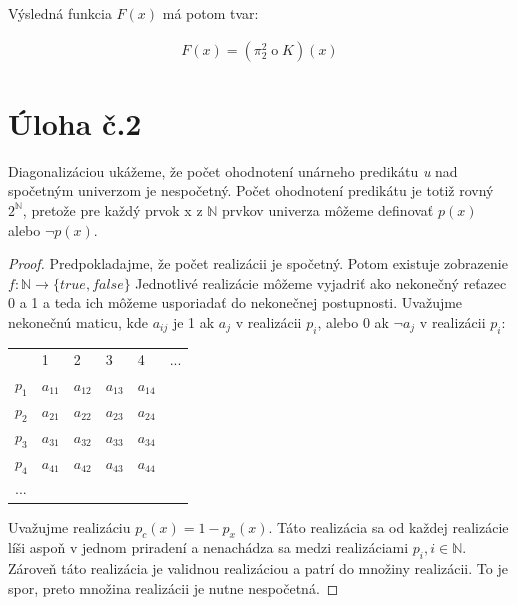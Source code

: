 \documentclass[10pt]{article}
\begin{document}
Výsledná funkcia $F(x)$ má potom tvar:

\begin{align*}
    F(x) = (\pi_2^2 \mathbin{o} K) (x)
\end{align*}

\section*{Úloha č.2}
Diagonalizáciou ukážeme, že počet ohodnotení unárneho predikátu \textit{u} nad spočetným univerzom je nespočetný. Počet ohodnotení predikátu je totiž rovný $2^{\mathbb{N}}$, pretože pre každý prvok x z $\mathbb{N}$ prvkov univerza môžeme definovať $p(x)$ alebo $\neg p(x)$.

\begin{proof}
    Predpokladajme, že počet realizácii je spočetný. Potom existuje zobrazenie $f: \mathbb{N} \to \{true, false\}$ 
    Jednotlivé realizácie môžeme vyjadriť ako nekonečný reťazec 0 a 1 a teda ich môžeme usporiadať do nekonečnej postupnosti.
    Uvažujme nekonečnú maticu, kde $a_{ij}$ je 1 ak $a_j$ v realizácii $p_i$, alebo 0 ak $\neg a_j$ v realizácii $p_i$:
\begin{table}[ht]
\begin{tabular}{llllll}
    & 1   & 2   & 3    & 4  & ... \\
    $p_1$  & $a_{11}$ & $a_{12}$ & $a_{13}$  & $a_{14}$ &     \\
    $p_2$  & $a_{21}$ & $a_{22}$ & $a_{23}$  & $a_{24}$ &     \\
    $p_3$  & $a_{31}$ & $a_{32}$ & $a_{33}$  & $a_{34}$ &     \\
    $p_4$  & $a_{41}$ & $a_{42}$ & $a_{43}$  & $a_{44}$ &     \\
... &     &   &   &   &
\end{tabular}
\end{table}

Uvažujme realizáciu $p_c(x) = 1 - p_x(x)$. Táto realizácia sa od každej realizácie líši
    aspoň v jednom priradení a nenachádza sa medzi realizáciami $p_i, i \in \mathbb{N}$. Zároveň táto realizácia je validnou realizáciou a patrí do množiny realizácii. To je spor, preto množina realizácii je nutne nespočetná. 


\end{proof}
\end{document}
